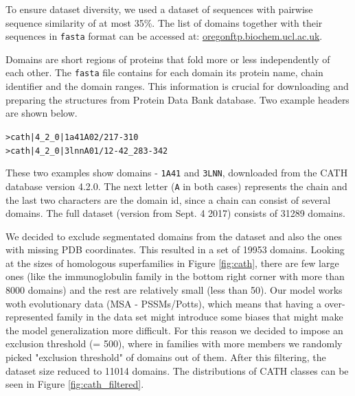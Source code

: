 To ensure dataset diversity, we used a dataset of sequences with pairwise sequence similarity of at most 35\%. 
The list of domains together with their sequences in \texttt{fasta} format can be accessed at: \href{ftp://orengoftp.biochem.ucl.ac.uk/cath/releases/latest-release/sequence-data/cath-domain-seqs-S35.fa}{oregonftp.biochem.ucl.ac.uk}.
    
Domains are short regions of proteins that fold more or less independently of each other. 
The \texttt{fasta} file contains for each domain its protein name, chain identifier and the domain ranges. 
This information is crucial for downloading and preparing the structures from Protein Data Bank database. 
Two example headers are shown below. 
    
\begin{center}
    \texttt{>cath|4\_2\_0|1a41A02/217-310}\\
    \texttt{>cath|4\_2\_0|3lnnA01/12-42\_283-342}
\end{center}
    
These two examples show domains - \texttt{1A41} and \texttt{3LNN}, downloaded from the CATH database version 4.2.0. 
The next letter (\texttt{A} in both cases) represents the chain and the last two characters are the domain id, since a chain can consist of several domains. 
The full dataset (version from Sept. 4 2017) consists of 31289 domains. 
    
We decided to exclude segmentated domains from the dataset and also the ones with missing PDB coordinates. 
This resulted in a set of 19953 domains. 
Looking at the sizes of homologous superfamilies in Figure \ref{fig:cath}, there are few large ones (like the immunoglobulin family in the bottom right corner with more than 8000 domains) and the rest are relatively small (less than 50). 
Our model works woth evolutionary data (MSA - PSSMs/Potts), which means that having a over-represented family in the data set might introduce some biases that might make the model generalization more difficult. 
For this reason we decided to impose an exclusion threshold (= 500), where in families with more members we randomly picked "exclusion threshold" of domains out of them. 
After this filtering, the dataset size reduced to 11014 domains.
The distributions of CATH classes can be seen in Figure \ref{fig:cath_filtered}.
    
